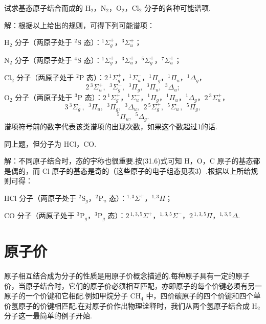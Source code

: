 \begin{xiti}

\quad 试求基态原子结合而成的 $\mathrm{H}_2$，$\mathrm{N}_2$，$\mathrm{O}_2$，$\mathrm{Cl}_2$ 分子的各种可能谱项.

解：根据以上给出的规则，可得下列可能谱项：

$\mathrm{H}_2$ 分子（两原子处于 $^2\mathrm{S}$ 态）：$^1\Sigma_g^+$，$^3\Sigma_u^+$；

$\mathrm{N}_2$ 分子（两原子处于 $^4\mathrm{S}$ 态）：$^1\Sigma_g^+$，$^3\Sigma_u^+$，$^5\Sigma_g^+$，$^7\Sigma_u^+$；

$\mathrm{Cl}_2$ 分子（两原子处于 $^2\mathrm{P}$ 态）：$2\,^1\Sigma_g^+$，$^1\Sigma_u^-$，$^1\Pi_g$，$^1\Pi_u$，$^1\Delta_g$，
\begin{equation*}
  2\,^3\Sigma_u^+,\ \ ^3\Sigma_g^-,\ \ ^3\Pi_g,\ \ ^3\Pi_u,\ \ ^3\Delta_u;
\end{equation*}
$\mathrm{O}_2$ 分子（两原子处于 $^3\mathrm{P}$ 态）：$2\,^1\Sigma_g^+$，$^1\Sigma_u^-$，$^1\Pi_g$，$^1\Pi_u$，$^1\Delta_g$，$2\,^3\Sigma_u^+$，
\begin{equation*}
  3\,^3\Sigma_g^-,\ \ ^3\Pi_u,\ \ ^3\Pi_g,\ \ ^3\Delta_u,\ \ 2\,^5\Sigma_g^+,\ \ ^5\Sigma_u^-,\ \ ^5\Pi_g,
\end{equation*}
\begin{equation*}
  ^5\Pi_u,\ \ ^5\Delta_g.
\end{equation*}
谱项符号前的数字代表该类谱项的出现次数，如果这个数超过1的话.

\quad 同上题，但分子为 HCl，CO.

解：不同原子结合时，态的宇称也很重要.按(31.6)式可知 H，O，C 原子的基态都是偶的，而 Cl 原子的基态是奇的（这些原子的电子组态见表3）.根据以上所给规则可得：

HCl 分子（两原子处于 $^2\mathrm{S}_g$，$^2\mathrm{P}_u$ 态）：$^{1,3}\Sigma^+$，$^{1,3}\Pi$；

CO 分子（两原子处于 $^3\mathrm{P}_g$，$^3\mathrm{P}_g$ 态）：$2\,^{1,3,5}\Sigma^+$，$^{1,3,5}\Sigma^-$，$2\,^{1,3,5}\Pi$，$^{1,3,5}\Delta$.

\end{xiti}

\section{原子价}

原子相互结合成为分子的性质是用原子价概念描述的.每种原子具有一定的原子价，当原子结合时，它们的原子价必须相互匹配，亦即原子的每个价键必须有另一原子的一个价键和它相配.例如甲烷分子 $\mathrm{CH}_4$ 中，四价碳原子的四个价键和四个单价氢原子的价键相匹配.在对原子价作出物理诠释时，我们从两个氢原子结合成 $\mathrm{H}_2$ 分子这一最简单的例子开始.


